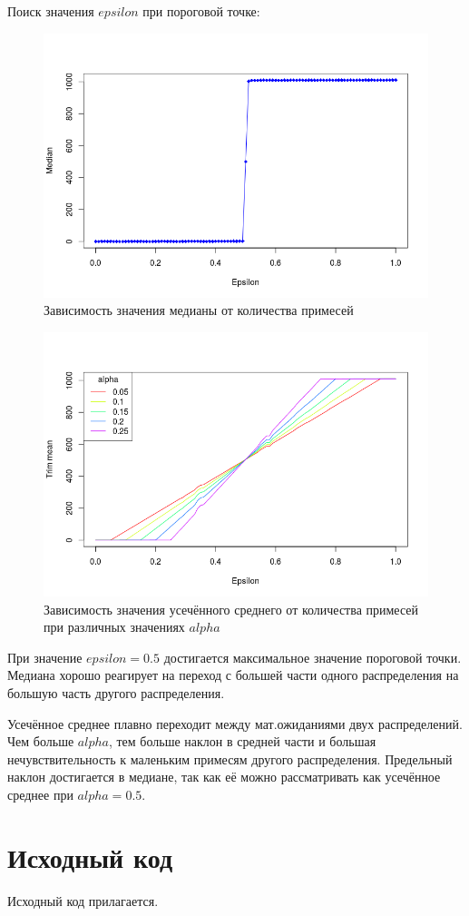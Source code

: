 \documentclass{article} %
\begin{document}
\clearpage
Поиск значения $epsilon$ при пороговой точке:
\begin{figure}[H]
    \centering
    \includegraphics[width=\textwidth]{median}
    \caption{Зависимость значения медианы от количества примесей}
\end{figure}

\begin{figure}[H]
    \centering
    \includegraphics[width=\textwidth]{trimmean}
    \caption{Зависимость значения усечённого среднего
    от количества примесей при различных значениях $alpha$}
\end{figure}

При значение $epsilon = 0.5$
достигается максимальное значение пороговой точки.
Медиана хорошо реагирует на
переход с большей части одного распределения
на большую часть другого распределения.

Усечённое среднее плавно переходит
между мат.ожиданиями двух распределений.
Чем больше $alpha$,
тем больше наклон в средней части и
большая нечувствительность к
маленьким примесям другого распределения.
Предельный наклон достигается в медиане,
так как её можно рассматривать как усечённое среднее
при $alpha = 0.5$.

\section*{Исходный код}
Исходный код прилагается.
\end{document}
